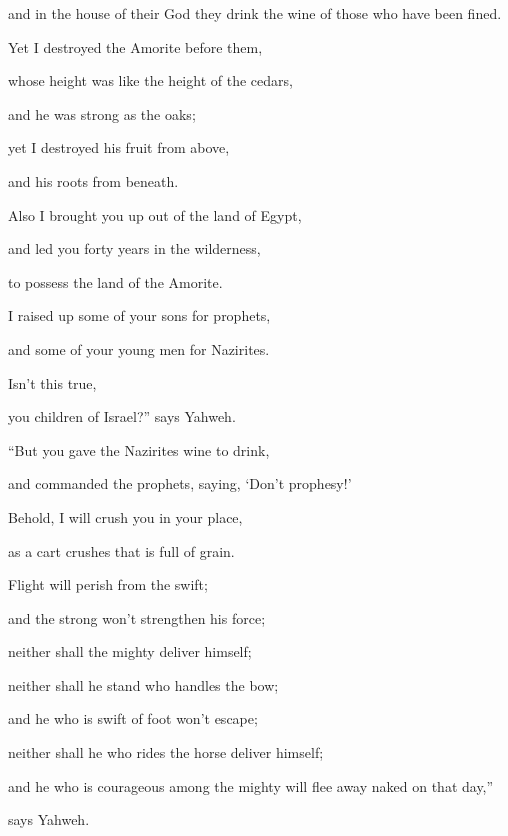 {\par }{\QB and in the house of their God they drink the wine of those who have been fined.
\par }{\Q {}Yet I destroyed the Amorite before them,
\par }{\QB whose height was like the height of the cedars,
\par }{\QB and he was strong as the oaks;
\par }{\QB yet I destroyed his fruit from above,
\par }{\QB and his roots from beneath.
\par }{\Q {}Also I brought you up out of the land of Egypt,
\par }{\QB and led you forty years in the wilderness,
\par }{\QB to possess the land of the Amorite.
\par }{\Q {}I raised up some of your sons for prophets,
\par }{\QB and some of your young men for Nazirites.
\par }{\Q Isn’t this true,
\par }{\QB you children of Israel?” says Yahweh.
\par }{\Q {}“But you gave the Nazirites wine to drink,
\par }{\QB and commanded the prophets, saying, ‘Don’t prophesy!’
\par }{\Q {}Behold, I will crush you in your place,
\par }{\QB as a cart crushes that is full of grain.
\par }{\Q {}Flight will perish from the swift;
\par }{\QB and the strong won’t strengthen his force;
\par }{\QB neither shall the mighty deliver himself;
\par }{\QB {}neither shall he stand who handles the bow;
\par }{\QB and he who is swift of foot won’t escape;
\par }{\QB neither shall he who rides the horse deliver himself;
\par }{\Q {}and he who is courageous among the mighty will flee away naked on that day,”
\par }{\PP says Yahweh.

}
